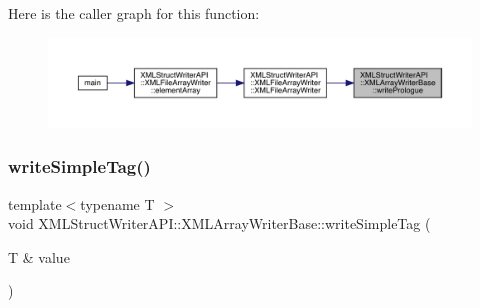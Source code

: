 Here is the caller graph for this function\+:\nopagebreak
\begin{figure}[H]
\begin{center}
\leavevmode
\includegraphics[width=350pt]{d5/d41/classXMLStructWriterAPI_1_1XMLArrayWriterBase_a7345d02ca5658546b764ed621044c68d_icgraph}
\end{center}
\end{figure}
\mbox{\label{classXMLStructWriterAPI_1_1XMLArrayWriterBase_a7c0092991561b5000ae55724cdc3d062}} 
\subsubsection{\texorpdfstring{writeSimpleTag()}{writeSimpleTag()}\hspace{0.1cm}{\footnotesize\ttfamily [1/2]}}
{\footnotesize\ttfamily template$<$typename T $>$ \\
void X\+M\+L\+Struct\+Writer\+A\+P\+I\+::\+X\+M\+L\+Array\+Writer\+Base\+::write\+Simple\+Tag (\begin{DoxyParamCaption}\item[{T \&}]{value }\end{DoxyParamCaption})\hspace{0.3cm}{\ttfamily [inline]}}

